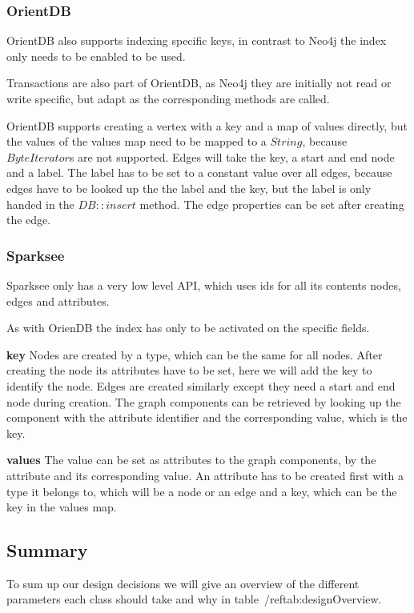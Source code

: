 \subsubsection{OrientDB}
OrientDB also supports indexing specific keys,
in contrast to Neo4j the index only needs to be enabled to be used.

Transactions are also part of OrientDB,
as Neo4j they are initially not read or write specific,
but adapt as the corresponding methods are called.

OrientDB supports creating a vertex with a key and a map of values directly, but the values of the values map need to be mapped to a $ String $,
because $ ByteIterator $s are not supported.
Edges will take the key, a start and end node and a label.
The label has to be set to a constant value over all edges,
because edges have to be looked up the the label and the key,
but the label is only handed in the $ DB::insert $ method.
The edge properties can be set after creating the edge.

\subsubsection{Sparksee}
Sparksee only has a very low level API,
which uses ids for all its contents nodes, edges and attributes.

As with OrienDB the index has only to be activated on the specific fields.

\textbf{key} \newline
Nodes are created by a type,
which can be the same for all nodes.
After creating the node its attributes have to be set,
here we will add the key to identify the node.
Edges are created similarly except they need a start and end node during creation.
The graph components can be retrieved by looking up the component with the attribute identifier and the corresponding value,
which is the key.

\textbf{values} \newline
The value can be set as attributes to the graph components,
by the attribute and its corresponding value.
An attribute has to be created first with a type it belongs to,
which will be a node or an edge and a key,
which can be the key in the values map.

\subsection{Summary}
\label{ch:design:se:summary}
To sum up our design decisions we will give an overview of the different parameters each class should take and why in table~/ref{tab:designOverview}.

